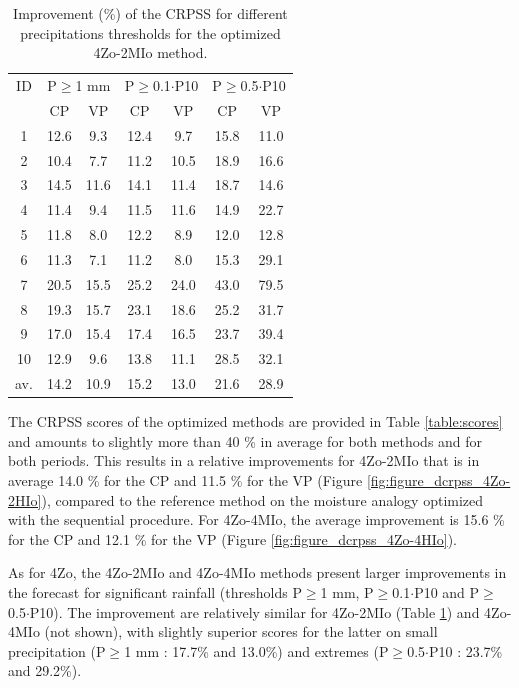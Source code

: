 \documentclass[review]{elsarticle}
\begin{document}
\begin{table}[htb]
	\caption{Improvement (\%) of the CRPSS for different precipitations thresholds for the optimized 4Zo-2MIo method.}
	\footnotesize
	\begin{center}
		\begin{tabular}{ccccccc}
			\hline 
			ID & \multicolumn{2}{c}{P\(\geq\)1 mm} & \multicolumn{2}{c}{P\(\geq\)0.1\(\cdot\)P10} & \multicolumn{2}{c}{P\(\geq\)0.5\(\cdot\)P10} \\  
			& CP & VP & CP & VP & CP & VP \\ 
			\hline 
			1 & 12.6 & 9.3 & 12.4 & 9.7 & 15.8 & 11.0 \\
			2 & 10.4 & 7.7 & 11.2 & 10.5 & 18.9 & 16.6 \\ 
			3 & 14.5 & 11.6 & 14.1 & 11.4 & 18.7 & 14.6 \\ 
			4 & 11.4 & 9.4 & 11.5 & 11.6 & 14.9 & 22.7 \\ 
			5 & 11.8 & 8.0 & 12.2 & 8.9 & 12.0 & 12.8 \\ 
			6 & 11.3 & 7.1 & 11.2 & 8.0 & 15.3 & 29.1 \\ 
			7 & 20.5 & 15.5 & 25.2 & 24.0 & 43.0 & 79.5 \\
			8 & 19.3 & 15.7 & 23.1 & 18.6 & 25.2 & 31.7 \\ 
			9 & 17.0 & 15.4 & 17.4 & 16.5 & 23.7 & 39.4 \\ 
			10 & 12.9 & 9.6 & 13.8 & 11.1 & 28.5 & 32.1 \\ 
			\hline 
			av. & 14.2 & 10.9 & 15.2 & 13.0 & 21.6 & 28.9 \\ 
			\hline 
		\end{tabular} 
	\end{center}
	\label{table:scores_thresholds_4Zo-2MIo}
\end{table}

The CRPSS scores of the optimized methods are provided in Table \ref{table:scores} and amounts to slightly more than 40 \% in average for both methods and for both periods. This results in a relative improvements for 4Zo-2MIo that is in average 14.0 \% for the CP and 11.5 \% for the VP (Figure \ref{fig:figure_dcrpss_4Zo-2HIo}), compared to the reference method on the moisture analogy optimized with the sequential procedure. For 4Zo-4MIo, the average improvement is 15.6 \% for the CP and 12.1 \% for the VP (Figure \ref{fig:figure_dcrpss_4Zo-4HIo}). 

As for 4Zo, the 4Zo-2MIo and 4Zo-4MIo methods present larger improvements in the forecast for significant rainfall (thresholds P\(\geq\)1 mm, P\(\geq\)0.1\(\cdot\)P10 and P\(\geq\)0.5\(\cdot\)P10). The improvement are relatively similar for 4Zo-2MIo (Table \ref{table:scores_thresholds_4Zo-2MIo}) and 4Zo-4MIo (not shown), with slightly superior scores for the latter on small precipitation (P\(\geq\)1 mm : 17.7\% and 13.0\%) and extremes (P\(\geq\)0.5\(\cdot\)P10 : 23.7\% and 29.2\%).
\end{document}
